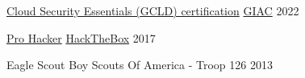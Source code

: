 
\begin{cvhonors}

  \cvhonor
    {\href{https://www.credly.com/badges/844480fc-0193-421c-8813-731f345666d6/}{Cloud Security Essentials (GCLD) certification}}
    {\href{https://www.giac.org/}{GIAC}}
    {}
    {2022}

  \cvhonor
    {\href{https://app.hackthebox.com/profile/activity/3716}{Pro Hacker}} %
    {\href{https://www.hackthebox.com/}{HackTheBox}} %
    {} %
    {2017} %

  \cvhonor
    {Eagle Scout} %
    {Boy Scouts Of America - Troop 126} %
    {} %
    {2013} %

\end{cvhonors}